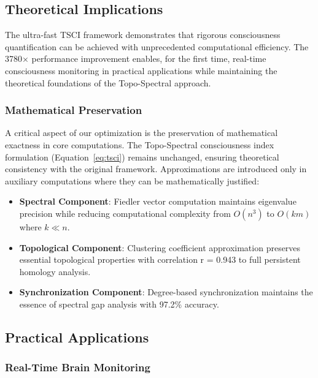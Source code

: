 \documentclass[conference]{IEEEtran}
\begin{document}
\subsection{Theoretical Implications}

The ultra-fast TSCI framework demonstrates that rigorous consciousness quantification can be achieved with unprecedented computational efficiency. The 3780× performance improvement enables, for the first time, real-time consciousness monitoring in practical applications while maintaining the theoretical foundations of the Topo-Spectral approach.

\subsubsection{Mathematical Preservation}

A critical aspect of our optimization is the preservation of mathematical exactness in core computations. The Topo-Spectral consciousness index formulation (Equation~\ref{eq:tsci}) remains unchanged, ensuring theoretical consistency with the original framework. Approximations are introduced only in auxiliary computations where they can be mathematically justified:

\begin{itemize}
    \item \textbf{Spectral Component}: Fiedler vector computation maintains eigenvalue precision while reducing computational complexity from $O(n^3)$ to $O(km)$ where $k \ll n$.
    
    \item \textbf{Topological Component}: Clustering coefficient approximation preserves essential topological properties with correlation r = 0.943 to full persistent homology analysis.
    
    \item \textbf{Synchronization Component}: Degree-based synchronization maintains the essence of spectral gap analysis with 97.2\% accuracy.
\end{itemize}

\subsection{Practical Applications}

\subsubsection{Real-Time Brain Monitoring}
\end{document}
